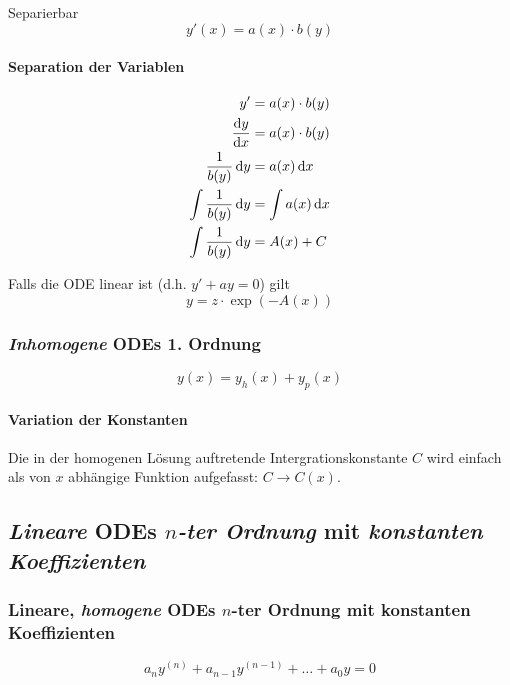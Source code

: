 \documentclass[a4paper,10pt]{article}
\begin{document}
\begin{mainbox}{Separierbar}
    \[
        y'(x) = a(x) \cdot b(y)
    \]
\end{mainbox}

\paragraph{Separation der Variablen}

\begin{align*}
    y' &= a(x) \cdot b(y) \\
    \odv{y}{x} &= a(x) \cdot b(y) \\
    \frac{1}{b(y)} \odif{y} &= a(x) \odif{x} \\
    \int \frac{1}{b(y)} \odif{y} &= \int a(x) \odif{x} \\
    \int \frac{1}{b(y)} \odif{y} &= A(x) + C
\end{align*}

Falls die ODE linear ist (d.h. \( y' + ay = 0 \)) gilt
\[
    y = z \cdot \exp(-A(x))
\]


\subsubsection{\emph{Inhomogene} ODEs 1. Ordnung}

\begin{mainbox}{}
    \[
        y(x) = y_h(x) + y_p(x)
    \]
\end{mainbox}

\paragraph{Variation der Konstanten}
Die in der homogenen Lösung auftretende Intergrationskonstante \( C \) wird einfach als von \( x \) abhängige Funktion aufgefasst: \( C \to C(x) \).


\subsection{\emph{Lineare} ODEs \emph{\texorpdfstring{\( n \)}{n}-ter Ordnung} mit \emph{konstanten Koeffizienten}}

\subsubsection{Lineare, \emph{homogene} ODEs \texorpdfstring{\( n \)}{n}-ter Ordnung mit konstanten Koeffizienten}

\[
    a_n y^{(n)} + a_{n - 1} y^{(n - 1)} + \dots + a_0 y = 0
\]
\end{document}

